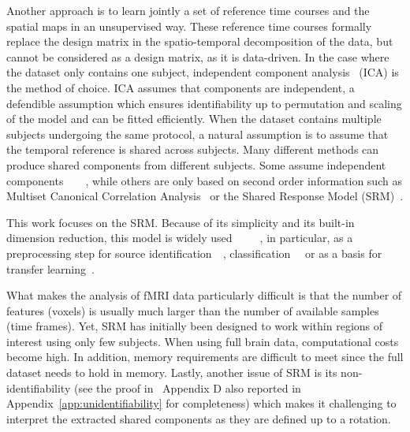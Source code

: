 \documentclass{article}
\begin{document}
Another approach is to learn jointly a set of reference time courses  and the spatial maps in
an unsupervised way.
%
These reference time courses formally replace the design matrix in the
spatio-temporal decomposition of the data, but cannot be considered as
a design matrix, as it is data-driven.
%
In the case where the dataset only contains  one subject,
independent component analysis~\cite{jutten1991blind} (ICA) is the method of choice.
%
ICA assumes that components are independent, a defendible assumption
which ensures identifiability up to permutation and scaling of the
model and can be fitted efficiently.
%
When the dataset contains multiple subjects undergoing the same
protocol, a natural assumption is to assume that the temporal reference is
shared across subjects.
%
Many different methods can produce shared components from different
subjects.
%
Some assume independent
components~\cite{richard2021model}~\cite{richard2020modeling}~\cite{varoquaux2009canica}~\cite{calhoun2001method},
while others are only based on second order information such as
Multiset Canonical Correlation Analysis~\cite{via2011joint} or the
Shared Response Model (SRM)~\cite{chen2015reduced}.
%

This work focuses on the SRM. Because of its simplicity and its
built-in dimension reduction, this model is widely
used~\cite{baldassano2017discovering}~\cite{cohen2017computational}~\cite{baldassano2018representation}~\cite{jolly2020custom}~\cite{lee2021anticipation},
in particular, as a preprocessing step for source
identification~\cite{richard2021model}~\cite{richard2020modeling},
classification~\cite{turek2018capturing}~\cite{chen2017shared}\cite{zhang2016searchlight}
or as a basis for transfer learning~\cite{zhang2018transfer}.


What makes the analysis of fMRI data particularly difficult is that
the number of features (voxels) is usually much
larger than the number of available samples (time frames).
Yet, SRM has initially been designed to work within regions of interest using
only few subjects.
%
When using full brain data, computational costs become
high.
%
In addition, memory requirements are difficult to meet since the full dataset
needs to hold in memory.
%
Lastly, another issue of SRM is its non-identifiability (see the proof
in~\cite{richard2020modeling} Appendix D also reported in Appendix~\ref{app:unidentifiability} for completeness) which makes it challenging to
interpret the extracted shared components as they are defined up to a rotation.
%
\end{document}
